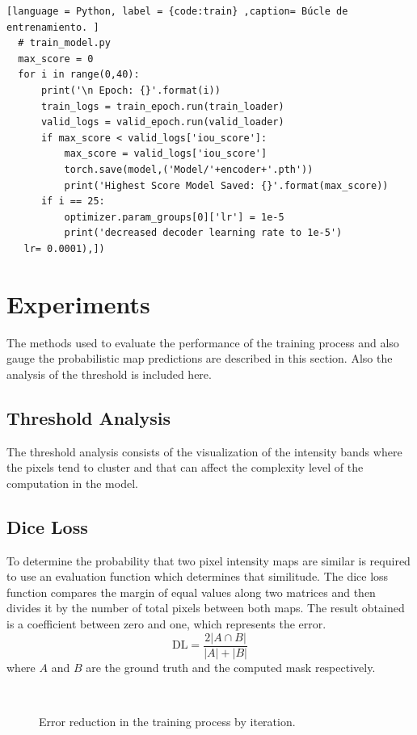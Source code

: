 \begin{lstlisting}[language = Python, label = {code:train} ,caption= Búcle de entrenamiento. ]
  # train_model.py
  max_score = 0 
  for i in range(0,40):
      print('\n Epoch: {}'.format(i))
      train_logs = train_epoch.run(train_loader)
      valid_logs = valid_epoch.run(valid_loader)
      if max_score < valid_logs['iou_score']:
          max_score = valid_logs['iou_score']
          torch.save(model,('Model/'+encoder+'.pth'))
          print('Highest Score Model Saved: {}'.format(max_score))
      if i == 25:
          optimizer.param_groups[0]['lr'] = 1e-5
          print('decreased decoder learning rate to 1e-5')
   lr= 0.0001),])
\end{lstlisting}


\section{Experiments}
The methods used to evaluate the performance of the training process and also gauge the probabilistic map predictions are described in this section. Also the analysis of the threshold is included here.

\subsection{Threshold Analysis}
The threshold analysis consists of the visualization of the intensity bands where the pixels tend to cluster and that can affect the complexity level of the computation in the model.


\subsection{Dice Loss}
To determine the probability that two pixel intensity maps are similar is required to use an evaluation function which determines that similitude. The dice loss function compares the margin of equal values along two matrices and then divides it by the number of total pixels between both maps. The result obtained is a coefficient between zero and one, which represents the error.
  \begin{equation}\label{eq:dice_loss}
      \text{DL} = \frac{2|A \cap B |}{|A| + |B|}
  \end{equation}        
where $A$ and $B$ are the ground truth and the computed mask respectively.

\begin{figure}[h]
  \centering
   \\
  \caption{Error reduction in the training process by iteration.}
  \label{fig:DL_plots}
\end{figure}

